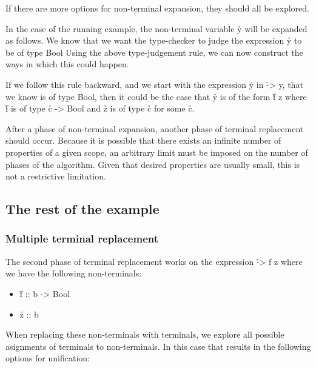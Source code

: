 \documentclass[a4paper, 11pt, onepage]{article}
\begin{document}
If there are more options for non-terminal expansion, they should all be explored.

In the case of the running example, the non-terminal variable \h{y} will be expanded as follows.
We know that we want the type-checker to judge the expression \h{y} to be of type \h{Bool}
Using the above type-judgement rule, we can now construct the ways in which this could happen.

If we follow this rule backward, and we start with the expression \h{y} in \h{\x -> y}, that we know is of type \h{Bool}, then it could be the case that \h{y} is of the form \h{f z} where \h{f} is of type \h{c -> Bool} and \h{z} is of type \h{c} for some \h{c}.

After a phase of non-terminal expansion, another phase of terminal replacement should occur.
Because it is possible that there exists an infinite number of properties of a given scope, an arbitrary limit must be imposed on the number of phases of the algorithm.
Given that desired properties are usually small, this is not a restrictive limitation.


\subsection{The rest of the example}

\subsubsection{Multiple terminal replacement}

The second phase of terminal replacement works on the expression \h{\x -> f z} where we have the following non-terminals:

\begin{itemize}
  \item \h{f :: b -> Bool}
  \item \h{z :: b}
\end{itemize}

When replacing these non-terminals with terminals, we explore all possible asignments of terminals to non-terminals.
In this case that results in the following options for unification:
\end{document}

